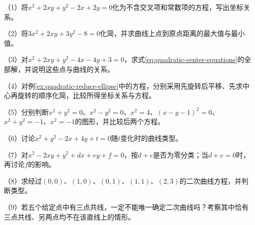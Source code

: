 \newpage
\begin{exercise}
\mbox{}

\begin{samepage}
（1）将\(x^2+2xy+y^2-2x+2y=0\)化为不含交叉项和常数项的方程，写出坐标关系。
\par
\end{samepage}

\begin{samepage}
（2）将\(3x^2+2xy+3y^2-8=0\)化简，并求曲线上点到原点距离的最大值与最小值。
\par
\end{samepage}

\begin{samepage}
（3）对\(x^2+2xy+y^2-4x-4y+3=0\)，求式\eqref{eq:quadratic-center-equations}的全部解，并说明这些点与曲线的关系。
\par
\end{samepage}

\begin{samepage}
（4）对例\ref{ex:quadratic-reduce-ellipse}中的方程，分别采用先旋转后平移、先求中心再旋转的顺序化简，比较所得坐标关系与方程。
\par
\end{samepage}

\begin{samepage}
（5）分别判断\(x^2+y^2=0\)、\(x^2-y^2=0\)、\(x^2=4\)、\((x-y-1)^2=0\)、\(x^2+y^2=-1\)、\(x^2=-1\)的图形，并比较后两个方程。
\par
\end{samepage}

\begin{samepage}
（6）讨论\(x^2+y^2-2x+4y+t=0\)随\(t\)变化时的曲线类型。
\par
\end{samepage}

\begin{samepage}
（7）对\(x^2-2xy+y^2+dx+ey+f=0\)，按\(d+e\)是否为零分类；当\(d+e=0\)时，再讨论\(f\)的影响。
\par
\end{samepage}

\begin{samepage}
（8）求经过\((0,0)\)、\((1,0)\)、\((0,1)\)、\((1,1)\)、\((2,3)\)的二次曲线方程，并判断类型。
\par
\end{samepage}

\begin{samepage}
（9）若五个给定点中有三点共线，一定不能唯一确定二次曲线吗？考察其中恰有三点共线、另两点均不在该直线上的情形。
\par
\end{samepage}


\end{exercise}
